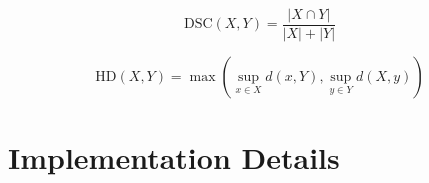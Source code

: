 \documentclass[twoside]{article}
\begin{document}
\begin{equation}
\text{DSC}(X, Y) = \frac{|X \cap Y|}{|X| + |Y|}
\label{dsc}
\end{equation}

\begin{equation}
\text{HD}(X, Y) = \max \left( \sup_{x \in X} d(x, Y), \sup_{y \in Y} d(X, y) \right)
\label{hd}
\end{equation}







\section{Implementation Details} \label{app:implementation_details}

\end{document}
